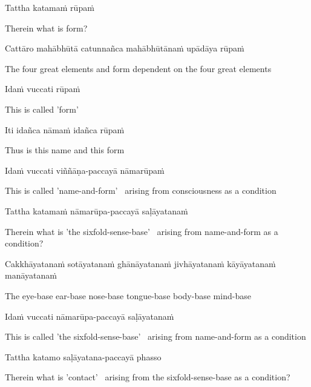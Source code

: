 Tattha katamaṁ rūpaṁ

\begin{cprenglish}
  Therein what is form?
\end{cprenglish}

Cattāro mahābhūtā catunnañca mahābhūtānaṁ upādāya rūpaṁ

\begin{cprenglish}
  The four great elements and form dependent on the four great elements
\end{cprenglish}

Idaṁ vuccati rūpaṁ

\begin{cprenglish}
  This is called 'form'
\end{cprenglish}

Iti idañca nāmaṁ idañca rūpaṁ

\begin{cprenglish}
  Thus is this name and this form
\end{cprenglish}

Idaṁ vuccati viññāṇa-paccayā nāmarūpaṁ

\begin{cprenglish}
  This is called 'name-and-form' \breathmark\ arising from consciousness as a condition
\end{cprenglish}

Tattha katamaṁ nāmarūpa-paccayā saḷāyatanaṁ

\begin{cprenglish}
  Therein what is 'the sixfold-sense-base' \breathmark\ arising from name-and-form as a condition?
\end{cprenglish}

Cakkhāyatanaṁ sotāyatanaṁ ghānāyatanaṁ jivhāyatanaṁ kāyāyatanaṁ manāyatanaṁ

\begin{cprenglish}
  The eye-base ear-base nose-base tongue-base body-base mind-base
\end{cprenglish}

Idaṁ vuccati nāmarūpa-paccayā saḷāyatanaṁ

\begin{cprenglish}
  This is called 'the sixfold-sense-base' \breathmark\ arising from name-and-form as a condition
\end{cprenglish}

Tattha katamo saḷāyatana-paccayā phasso

\begin{cprenglish}
  Therein what is 'contact' \breathmark\ arising from the sixfold-sense-base as a condition?
\end{cprenglish}

